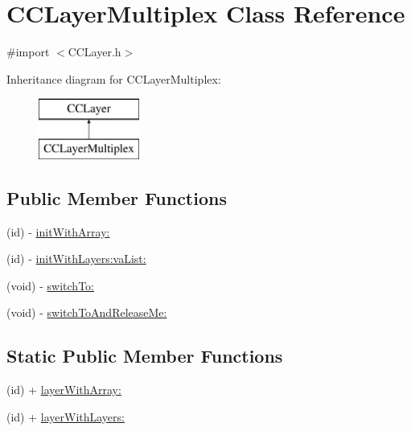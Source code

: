 \hypertarget{interface_c_c_layer_multiplex}{\section{C\-C\-Layer\-Multiplex Class Reference}
\label{interface_c_c_layer_multiplex}
}


{\ttfamily \#import $<$C\-C\-Layer.\-h$>$}

Inheritance diagram for C\-C\-Layer\-Multiplex\-:\begin{figure}[H]
\begin{center}
\leavevmode
\includegraphics[height=2.000000cm]{interface_c_c_layer_multiplex}
\end{center}
\end{figure}
\subsection*{Public Member Functions}
\begin{DoxyCompactItemize}
\item 
(id) -\/ \hyperlink{interface_c_c_layer_multiplex_a1a63566bbdaf96cccc4898167bfd2e57}{init\-With\-Array\-:}
\item 
(id) -\/ \hyperlink{interface_c_c_layer_multiplex_a0466ff97dbd68b74a356d4d50aa1ca57}{init\-With\-Layers\-:va\-List\-:}
\item 
(void) -\/ \hyperlink{interface_c_c_layer_multiplex_aa90f9f4de1d496bb4ac0ac174a770d88}{switch\-To\-:}
\item 
(void) -\/ \hyperlink{interface_c_c_layer_multiplex_afb62888b5ffbcd7f42d12d6629d543ae}{switch\-To\-And\-Release\-Me\-:}
\end{DoxyCompactItemize}
\subsection*{Static Public Member Functions}
\begin{DoxyCompactItemize}
\item 
(id) + \hyperlink{interface_c_c_layer_multiplex_a6e4e8f8fa4bf567c475ca4dc9691fbd9}{layer\-With\-Array\-:}
\item 
(id) + \hyperlink{interface_c_c_layer_multiplex_a4c05c2b18a1779925c76b33169c5673c}{layer\-With\-Layers\-:}
\end{DoxyCompactItemize}
